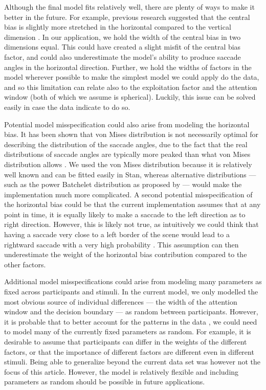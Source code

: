 \documentclass{article}
\begin{document}
Although the final model fits relatively well, there are plenty of ways to make it better in the future. For example, previous research suggested that the central bias is slightly more stretched in the horizontal compared to the vertical dimension \citep{tatler2007central,clarke2014deriving}. In our application, we hold the width of the central bias in two dimensions equal. This could have created a slight misfit of the central bias factor, and could also underestimate the model's ability to produce saccade angles in the horizontal direction. Further, we hold the widths of factors in the model wherever possible to make the simplest model we could apply do the data, and so this limitation can relate also to the exploitation factor and the attention window (both of which we assume is spherical). Luckily, this issue can be solved easily in case the data indicate to do so.

Potential model misspecification could also arise from modeling the horizontal bias. It has been shown that von Mises distribution is not necessarily optimal for describing the distribution of the saccade angles, due to the fact that the real distributions of saccade angles are typically more peaked than what von Mises distribution allows \citep{mulder2020mixtures}. We used the von Mises distribution because it is relatively well known and can be fitted easily in Stan, whereas alternative distributions --- such as the power Batchelet distribution as proposed by \citet{mulder2020mixtures} --- would make the implementation much more complicated. A second potential misspecification of the horizontal bias could be that the current implementation assumes that at any point in time, it is equally likely to make a saccade to the left direction as to right direction. However, this is likely not true, as intuitively we could think that having a saccade very close to a left border of the scene would lead to a rightward saccade with a very high probability \citep{clarke2017saccadic}. This assumption can then underestimate the weight of the horizontal bias contribution compared to the other factors. 

Additional model misspecifications could arise from modeling many parameters as fixed across participants and stimuli. In the current model, we only modelled the most obvious source of individual differences --- the width of the attention window and the decision boundary --- as random between participants. However, it is probable that to better account for the patterns in the data \citep[and to justify generalizibility to a population of observers and a population of stimuli; ][]{yarkoni2019generalizability}, we could need to model many of the currently fixed parameters as random. For example, it is desirable to assume that participants can differ in the weights of the different factors, or that the importance of different factors are different even in different stimuli. Being able to generalize beyond the current data set was however not the focus of this article. However, the model is relatively flexible and including parameters as random should be possible in future applications.
\end{document}
